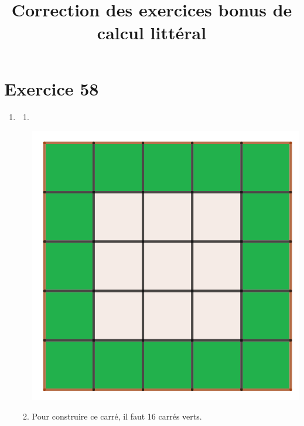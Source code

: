 \documentclass[12pt,a4paper]{article}
\title{Correction des exercices bonus de calcul littéral}
\date{}
\begin{document}
	
\maketitle

\vspace*{-1cm}

\section*{Exercice 58}


\begin{enumerate}[label={\arabic*)}]
	
		
		
		
		
	
	\item \begin{enumerate}[label={\alph*)}]
		\item \ 
		\begin{center}
			\includegraphics[scale=0.2]{./img/carre}
		\end{center}
	
		\item Pour construire ce carré, il faut 16 carrés verts.
	\end{enumerate}
	

\end{enumerate}
\end{document}
